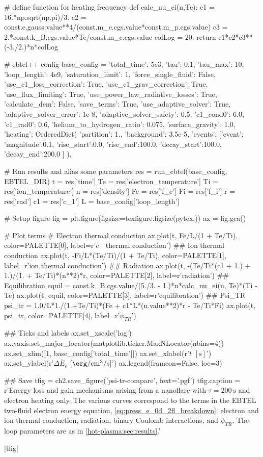 \begin{pycode}[chapter2]
# define function for heating frequency
def calc_nu_ei(n,Te):
    c1 = 16.*np.sqrt(np.pi)/3.
    c2 = const.e.gauss.value**4/(const.m_e.cgs.value*const.m_p.cgs.value)
    c3 = 2.*const.k_B.cgs.value*Te/const.m_e.cgs.value
    colLog = 20.
    return c1*c2*c3**(-3./2.)*n*colLog

# ebtel++ config
base_config = {
    'total_time': 5e3,
    'tau': 0.1,
    'tau_max': 10,
    'loop_length': 4e9,
    'saturation_limit': 1,
    'force_single_fluid': False,
    'use_c1_loss_correction': True,
    'use_c1_grav_correction': True,
    'use_flux_limiting': True,
    'use_power_law_radiative_losses': True,
    'calculate_dem': False,
    'save_terms': True,
    'use_adaptive_solver': True,
    'adaptive_solver_error': 1e-8,
    'adaptive_solver_safety': 0.5,
    'c1_cond0': 6.0,
    'c1_rad0': 0.6,
    'helium_to_hydrogen_ratio': 0.075,
    'surface_gravity': 1.0,
    'heating': OrderedDict({
        'partition': 1.,
        'background': 3.5e-5,
        'events': [{'event':{
            'magnitude':0.1,
            'rise_start':0.0,
            'rise_end':100.0,
            'decay_start':100.0,
            'decay_end':200.0}}
        ]
    }),
}

# Run results and alias some parameters
res = run_ebtel(base_config, EBTEL_DIR)
t = res['time']
Te = res['electron_temperature']
Ti = res['ion_temperature']
n = res['density']
Fe = res['f_e']
Fi = res['f_i']
r = res['rad']
c1 = res['c_1']
L = base_config['loop_length']

# Setup figure
fig = plt.figure(figsize=texfigure.figsize(pytex,))
ax = fig.gca()

# Plot terms
# Electron thermal conduction
ax.plot(t, Fe/L/(1 + Te/Ti), color=PALETTE[0], label=r'$e^-$ thermal conduction')
## Ion thermal conduction
ax.plot(t, -Fi/L*(Te/Ti)/(1 + Te/Ti), color=PALETTE[1], label=r'ion thermal conduction')
## Radiation
ax.plot(t, -(Te/Ti*(c1 + 1.) + 1.)/(1. + Te/Ti)*(n**2)*r, color=PALETTE[2], label=r'radiation')
## Equilibration
equil = const.k_B.cgs.value/(5./3. - 1.)*n*calc_nu_ei(n, Te)*(Ti - Te)
ax.plot(t, equil, color=PALETTE[3], label=r'equilibration')
## Psi_TR
psi_tr = 1.0/L*1./(1.+Te/Ti)*(Fe + c1*L*(n.value**2)*r - Te/Ti*Fi)
ax.plot(t, psi_tr, color=PALETTE[4], label=r'$\psi_{TR}$')

## Ticks and labels
ax.set_xscale('log')
ax.yaxis.set_major_locator(matplotlib.ticker.MaxNLocator(nbins=4))
ax.set_xlim([1, base_config['total_time']])
ax.set_xlabel(r'$t$ $[\si{\second}]$')
ax.set_ylabel(r'$\Delta\bar{E}_e$ $[\si{\erg\per\cubic\cm\per\second}]$')
ax.legend(frameon=False, loc=3)
      
## Save
tfig = ch2.save_figure('psi-tr-compare', fext='.pgf')
tfig.caption = r'Energy loss and gain mechanisms arising from a nanoflare with $\tau=\SI{200}{\second}$ and electron heating only. The various curves correspond to the terms in the EBTEL two-fluid electron energy equation, \autoref{eq:press_e_0d_2fl_breakdown}: electron and ion thermal conduction, radiation, binary Coulomb interactions, and $\psi_{TR}$. The loop parameters are as in \autoref{hot-plasma:sec:results}.'
\end{pycode}
\py[chapter2]|tfig|

